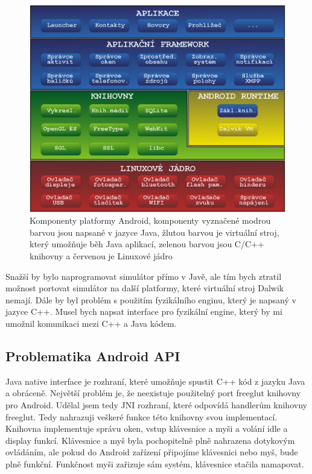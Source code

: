 \documentclass[11pt,twoside,a4paper]{book}
\begin{document}
\begin{center}
\begin{figure}[h!]
\includegraphics[width=120mm]{figures/android.png}
\caption{Komponenty platformy Android, komponenty vyznačené modrou barvou jsou napsané v jazyce Java, žlutou barvou je virtuální stroj, který umožňuje běh Java aplikací, zelenou barvou jsou C/C++ knihovny a červenou je Linuxové jádro}
\end{figure}
\end{center}

Snažší by bylo naprogramovat simulátor přímo v Javě, ale tím bych ztratil možnost portovat simulátor na další platformy, které virtuální stroj Dalwik nemají. Dále by byl problém s použitím fyzikálního enginu, který je napsaný v jazyce C++. Musel bych napsat interface pro fyzikální engine, který by mi umožnil komunikaci mezi C++ a Java kódem.

\subsection{Problematika Android API}
Java native interface je rozhraní, které umožňuje spustit C++ kód z jazyku Java a obráceně. Největší problém je, že neexistuje použitelný port freeglut knihovny pro Android. Udělal jsem tedy JNI rozhraní, které odpovídá handlerům knihovny freeglut. Tedy nahrazuji veškeré funkce této knihovny svou implementací. Knihovna implementuje správu oken, vstup klávesnice a myši a volání idle a display funkcí. Klávesnice a myš byla pochopitelně plně nahrazena dotykovým ovládáním, ale pokud do Android zařízení připojíme klávesnici nebo myš, bude plně funkční. Funkčnost myši zařizuje sám systém, klávesnice stačila namapovat.
\end{document}
